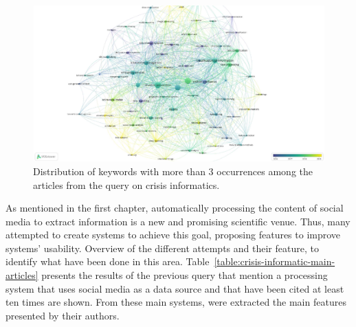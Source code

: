 \begin{figure}[bp]
    \includegraphics[width=\paperwidth,height=\paperheight,keepaspectratio, angle=90]{figures/chap-2/crisis-informatic-overlay.pdf}
    \caption{Distribution of keywords with more than 3 occurrences among the articles from the query on crisis informatics. }
    \label{literature:crisis-informatic-overlay}
\end{figure}

As mentioned in the first chapter, automatically processing the content of social media to extract information is a new and promising scientific venue.
Thus, many attempted to create systems to achieve this goal, proposing features to improve systems' usability.
Overview of the different attempts and their feature, to identify what have been done in this area.
Table~\ref{table:crisis-informatic-main-articles} presents the results of the previous query that mention a processing system that uses social media as a data source and that have been cited at least ten times are shown.
From these main systems, were extracted the main features presented by their authors.

